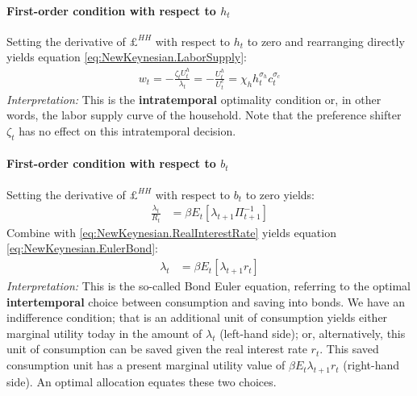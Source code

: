 \begin{enumerate}
\paragraph{First-order condition with respect to $h_t$}
Setting the derivative of $\pounds^{HH}$ with respect to $h_t$ to zero and rearranging directly yields equation \eqref{eq:NewKeynesian.LaborSupply}:
\begin{align*}
w_t = - \frac{\zeta_t {U^h_t}}{\lambda_t} = - \frac{U^h_t}{U^c_t} = \chi_h h_t^{\sigma_h} c_t^{\sigma_c}
\end{align*}
\emph{Interpretation:} This is the \textbf{intratemporal} optimality condition or, in other words, the labor supply curve of the household.
Note that the preference shifter $\zeta_t$ has no effect on this intratemporal decision.

\paragraph{First-order condition with respect to $b_t$}
Setting the derivative of $\pounds^{HH}$ with respect to $b_t$ to zero yields:
\begin{align*}
\frac{\lambda_t}{R_t} &= \beta E_t \left[\lambda_{t+1} \Pi_{t+1}^{-1} \right]
\end{align*}
Combine with \eqref{eq:NewKeynesian.RealInterestRate} yields equation \eqref{eq:NewKeynesian.EulerBond}:
\begin{align*}
\lambda_t &= \beta E_t \left[\lambda_{t+1} r_t\right]
\end{align*}
\emph{Interpretation:} This is the so-called Bond Euler equation,
 referring to the optimal \textbf{intertemporal} choice between consumption and saving into bonds.
We have an indifference condition; that is 
  an additional unit of consumption yields either marginal utility today in the amount of $\lambda_t$ (left-hand side);
or, alternatively, this unit of consumption can be saved given the real interest rate $r_t$.
This saved consumption unit has a present marginal utility value of $\beta E_t \lambda_{t+1} r_t$ (right-hand side).
An optimal allocation equates these two choices.


\end{enumerate}
